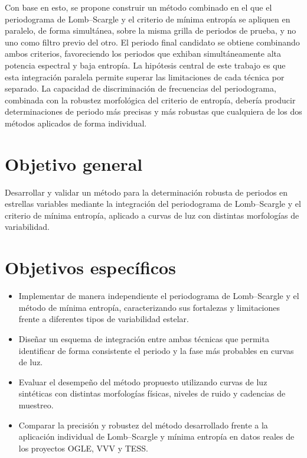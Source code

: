 \documentclass[12pt,letterpaper,oneside]{book}
\begin{document}
Con base en esto, se propone construir un m\'etodo combinado en el que el periodograma de Lomb--Scargle y el criterio de m\'inima entrop\'ia se apliquen en paralelo, de forma simult\'anea, sobre la misma grilla de periodos de prueba, y no uno como filtro previo del otro. El periodo final candidato se obtiene combinando ambos criterios, favoreciendo los periodos que exhiban simult\'aneamente alta potencia espectral y baja entrop\'ia. La hip\'otesis central de este trabajo es que esta integraci\'on paralela permite superar las limitaciones de cada t\'ecnica por separado. La capacidad de discriminaci\'on de frecuencias del periodograma, combinada con la robustez morfol\'ogica del criterio de entrop\'ia, deber\'ia producir determinaciones de periodo m\'as precisas y m\'as robustas que cualquiera de los dos m\'etodos aplicados de forma individual.

\section{Objetivo general}
\label{sec:objetivo-general}

Desarrollar y validar un m\'etodo para la determinaci\'on robusta de periodos en estrellas variables mediante la integraci\'on del periodograma de Lomb--Scargle y el criterio de m\'inima entrop\'ia, aplicado a curvas de luz con distintas morfolog\'ias de variabilidad.

\section{Objetivos espec\'ificos}
\label{sec:objetivos-especificos}

\begin{itemize}
	\item Implementar de manera independiente el periodograma de Lomb--Scargle y el m\'etodo de m\'inima entrop\'ia, caracterizando sus fortalezas y limitaciones frente a diferentes tipos de variabilidad estelar.
	\item Dise\~nar un esquema de integraci\'on entre ambas t\'ecnicas que permita identificar de forma consistente el periodo y la fase m\'as probables en curvas de luz.
	\item Evaluar el desempe\~no del m\'etodo propuesto utilizando curvas de luz sint\'eticas con distintas morfolog\'ias f\'isicas, niveles de ruido y cadencias de muestreo.
	\item Comparar la precisi\'on y robustez del m\'etodo desarrollado frente a la aplicaci\'on individual de Lomb--Scargle y m\'inima entrop\'ia en datos reales de los proyectos OGLE, VVV y TESS.
\end{itemize}
\end{document}
